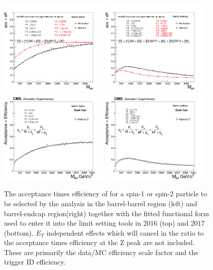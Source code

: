 \begin{figure}
  \begin{center}
    \includegraphics[width=0.47\textwidth]{figures/Zprime/2016/limitInputs/plot_acceff_BB.png}
    \includegraphics[width=0.47\textwidth]{figures/Zprime/2016/limitInputs/plot_acceff_BE.png}
    \includegraphics[width=0.47\textwidth]{figures/Zprime/2017/limitInputs/plot_acceff_BB.png}
    \includegraphics[width=0.47\textwidth]{figures/Zprime/2017/limitInputs/plot_acceff_BE.png}
    \caption{The acceptance times efficiency of for a spin-1 or spin-2 particle to be selected by the analysis in the barrel-barrel region (left) and barrel-endcap region(right) together with the fitted functional form used to enter it into the limit setting tools in 2016 (top) and 2017 (bottom). $E_T$ independent effects which will cancel in the ratio to the acceptance times efficiency at the Z peak are not included. These are primarily the data/MC efficiency scale factor and the trigger ID efficiency.}
    \label{fig:accEff}
  \end{center}
\end{figure}

